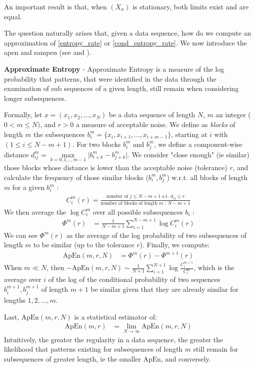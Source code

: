 An important result is that, when $(X_n)$ is stationary, both limits exist and are equal.

The question naturally arises that, given a data sequence, how do we compute an approximation of \ref{entropy_rate} or \ref{cond_entropy_rate}. We now introduce the \gls{apen} and \gls{sampen} (see \cite{delgado-bonal_approximate_2019} and \cite{pincus_approximate_1991}).

\textbf{Approximate Entropy} - Approximate Entropy is a measure of the log probability that patterns, that were identified in the data through the examination of sub sequences of a given length, still remain when considering longer subsequences. 

Formally, let $x = (x_1,x_2,...,x_N)$ be a data sequence of length $N$, $m$ an integer ($0 < m \leq N)$, and $r>0$ a measure of acceptable noise. We define as \textit{blocks} of length $m$ the subsequences $b_i^m = \{x_i, x_{i+1},...,x_{i+m-1}\}$, starting at $i$ with $(1 \leq i \leq N-m+1)$. For two blocks $b_i^m$ and $b_j^m$, we define a component-wise distance $d_{ij}^m = \underset{k=0,1,..,m-1}{\max}\vert b_{i+k}^m - b_{j+k}^m\vert$. We consider "close enough" (ie similar) those blocks whose distance is lower than the acceptable noise (tolerance) $r$, and calculate the frequency of those similar blocks ($b_i^m, b_j^m$) w.r.t. all blocks of length $m$ for a given $b_i^m$ : 
\begin{align}
    \label{Cim}
    C_i^m(r) = \frac{\text{number of $j \leq N-m+1$ s.t. $d_{ij} \leq r$}}{\text{number of blocks of length $m$ : $N-m+1$}}
\end{align}
We then average the $\log{C_i^m}$ over all possible subsequences $b_i$ :
\begin{align*}
    \Phi^m(r) &= \frac{1}{N-m+1} \sum_{i=1}^{N-m+1} \log{C_i^m(r)}
\end{align*}
We can see $\Phi^m(r)$ as the average of the log probability of two subsequences of length $m$ to be similar (up to the tolerance $r$).
Finally, we compute:
\begin{align}
    \text{ApEn}(m,r,N) &= \Phi^m(r) - \Phi^{m+1}(r)
\end{align}
When $m \ll N$, then $-\text{ApEn}(m,r,N) \sim \frac{1}{N+1}\sum_{i=1}^{N+1} \log{\frac{C_i^{m+1}}{C_i^m}}$, which is the average over $i$ of the log of the conditional probability of two sequences $b_i^{m+1}, b_j^{m+1}$ of length $m+1$ be similar given that they are already similar for lengths $1,2,...,m$.

Last, $\text{ApEn}(m,r,N)$ is a statistical estimator of:
\begin{align}
    \text{ApEn}(m,r) &= \underset{N \rightarrow \infty}{\lim} \text{ApEn}(m,r,N)
\end{align}
Intuitively, the greater the regularity in a data sequence, the greater the likelihood that patterns existing for subsequences of length $m$ still remain for subsequences of greater length, ie the smaller $\text{ApEn}$, and conversely.

